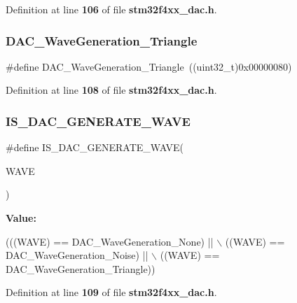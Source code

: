 Definition at line \textbf{ 106} of file \textbf{ stm32f4xx\+\_\+dac.\+h}.

\mbox{\label{group__DAC__wave__generation_ga68f1a71011437a5ea6298ab039554714}} 
\subsubsection{D\+A\+C\+\_\+\+Wave\+Generation\+\_\+\+Triangle}
{\footnotesize\ttfamily \#define D\+A\+C\+\_\+\+Wave\+Generation\+\_\+\+Triangle~((uint32\+\_\+t)0x00000080)}



Definition at line \textbf{ 108} of file \textbf{ stm32f4xx\+\_\+dac.\+h}.

\mbox{\label{group__DAC__wave__generation_ga50fb2dd12305cd7bd0b738a1f6388d3c}} 
\subsubsection{I\+S\+\_\+\+D\+A\+C\+\_\+\+G\+E\+N\+E\+R\+A\+T\+E\+\_\+\+W\+A\+VE}
{\footnotesize\ttfamily \#define I\+S\+\_\+\+D\+A\+C\+\_\+\+G\+E\+N\+E\+R\+A\+T\+E\+\_\+\+W\+A\+VE(\begin{DoxyParamCaption}\item[{}]{W\+A\+VE }\end{DoxyParamCaption})}

{\bfseries Value\+:}
\begin{DoxyCode}
(((WAVE) == DAC_WaveGeneration_None) || \(\backslash\)
                                    ((WAVE) == DAC_WaveGeneration_Noise) || \(\backslash\)
                                    ((WAVE) == DAC_WaveGeneration_Triangle))
\end{DoxyCode}


Definition at line \textbf{ 109} of file \textbf{ stm32f4xx\+\_\+dac.\+h}.

